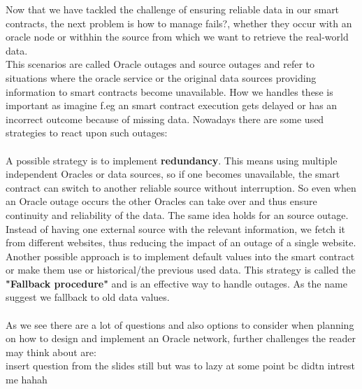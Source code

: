 \documentclass{article}
\begin{document}
Now that we have tackled the challenge of ensuring reliable data in our smart contracts, the next problem is how to manage fails?, whether they occur with an oracle node or withhin the source from which we want to retrieve the real-world data.
\\
This scenarios are called Oracle outages and source outages and refer to situations where the oracle service or the original data sources providing information to smart contracts become unavailable. How we handles these is important as imagine f.eg an smart contract execution gets delayed or has an incorrect outcome because of missing data. Nowadays there are some used strategies to react upon such outages:\\
\\
A possible strategy is to implement \textbf{redundancy}. This means using multiple independent Oracles or data sources, so if one becomes unavailable, the smart contract can switch to another reliable source without interruption. So even when an Oracle outage occurs the other Oracles can take over and thus ensure continuity and reliability of the data.
The same idea holds for an source outage. Instead of having one external source with the relevant information, we fetch it from different websites, thus reducing the impact of an outage of a single website. Another possible approach is to implement default values into the smart contract or make them use or historical/the previous used data. This strategy is called the \textbf{"Fallback procedure"} and is an effective way to handle outages. As the name suggest we fallback to old data values.\\
\\
As we see there are a lot of questions and also options to consider when planning on how to design and implement an Oracle network, further challenges the reader may think about are:
\\
insert question from the slides still but was to lazy at some point bc didtn intrest me hahah
\\
\end{document}
